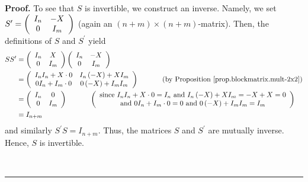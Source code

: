 \documentclass[numbers=enddot,12pt,final,onecolumn,notitlepage]{scrartcl}%
\numberwithin{exer}{subsection}
\theoremstyle{definition}
\newenvironment{proof}[1][Proof]{\noindent\textbf{#1.} }{\ \rule{0.5em}{0.5em}}
\begin{document}
\begin{proof}
To see that $S$ is invertible, we construct an inverse. Namely, we set
$S^{\prime}=\left(
\begin{array}
[c]{cc}%
I_{n} & -X\\
0 & I_{m}%
\end{array}
\right)  $ (again an $\left(  n+m\right)  \times\left(  n+m\right)  $-matrix).
Then, the definitions of $S$ and $S^{\prime}$ yield%
\begin{align*}
SS^{\prime}  &  =\left(
\begin{array}
[c]{cc}%
I_{n} & X\\
0 & I_{m}%
\end{array}
\right)  \left(
\begin{array}
[c]{cc}%
I_{n} & -X\\
0 & I_{m}%
\end{array}
\right) \\
&  =\left(
\begin{array}
[c]{cc}%
I_{n}I_{n}+X\cdot0 & I_{n}\left(  -X\right)  +XI_{m}\\
0I_{n}+I_{m}\cdot0 & 0\left(  -X\right)  +I_{m}I_{m}%
\end{array}
\right)  \ \ \ \ \ \ \ \ \ \ \left(  \text{by Proposition
\ref{prop.blockmatrix.mult-2x2}}\right) \\
&  =\left(
\begin{array}
[c]{cc}%
I_{n} & 0\\
0 & I_{m}%
\end{array}
\right)  \ \ \ \ \ \ \ \ \ \ \left(
\begin{array}
[c]{c}%
\text{since }I_{n}I_{n}+X\cdot0=I_{n}\text{ and }I_{n}\left(  -X\right)
+XI_{m}=-X+X=0\\
\text{and }0I_{n}+I_{m}\cdot0=0\text{ and }0\left(  -X\right)  +I_{m}%
I_{m}=I_{m}%
\end{array}
\right) \\
&  =I_{n+m}%
\end{align*}
and similarly $S^{\prime}S=I_{n+m}$. Thus, the matrices $S$ and $S^{\prime}$
are mutually inverse. Hence, $S$ is invertible.


\end{proof}
\end{document}
